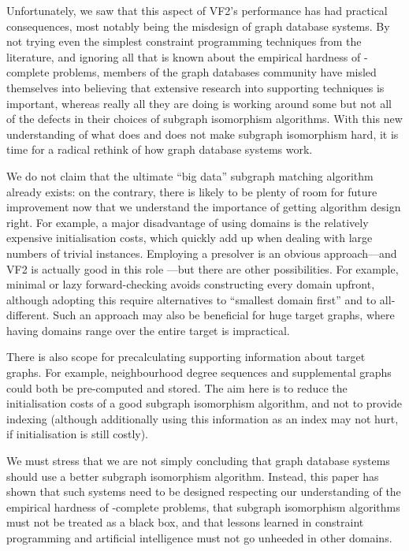 \documentclass[twoside,11pt]{article}
\newcommand{\citep}[1]{\cite{#1}}
\begin{document}
Unfortunately, we saw that this aspect of VF2's performance has had practical consequences, most
notably being the misdesign of graph database systems. By not trying even the simplest constraint
programming techniques from the literature, and ignoring all that is known about the empirical
hardness of \NP-complete problems, members of the graph databases community have misled themselves
into believing that extensive research into supporting techniques is important, whereas really all
they are doing is working around some but not all of the defects in their choices of subgraph
isomorphism algorithms. With this new understanding of what does and does not make subgraph
isomorphism hard, it is time for a radical rethink of how graph database systems work.

We do not claim that the ultimate ``big data'' subgraph matching algorithm already exists:
on the contrary, there is likely to be plenty of room for future improvement now that we understand
the importance of getting algorithm design right.  For example, a major disadvantage of using
domains is the relatively expensive initialisation costs, which quickly add up when dealing with
large numbers of trivial instances. Employing a presolver is an obvious approach---and VF2 is
actually good in this role \citep{DBLP:conf/lion/KotthoffMS16}---but there are other possibilities.
For example, minimal or lazy forward-checking
\citep{DBLP:conf/ictai/DentM94,DBLP:conf/cp/BacchusG95,o:Dent96,DBLP:conf/ecai/LarrosaM98} avoids
constructing every domain upfront, although adopting this require alternatives to ``smallest domain
first'' and to all-different. Such an approach may also be beneficial for huge target graphs, where
having domains range over the entire target is impractical.

There is also scope for precalculating supporting information about target graphs. For example,
neighbourhood degree sequences and supplemental graphs could both be pre-computed and stored. The aim
here is to reduce the initialisation costs of a good subgraph isomorphism algorithm, and not to
provide indexing (although additionally using this information as an index may not hurt, if
initialisation is still costly).

We must stress that we are not simply concluding that graph database systems should use a better
subgraph isomorphism algorithm.  Instead, this paper has shown that such systems need to be designed
respecting our understanding of the empirical hardness of \NP-complete problems, that subgraph
isomorphism algorithms must not be treated as a black box, and that lessons learned in constraint
programming and artificial intelligence must not go unheeded in other domains.




\end{document}
